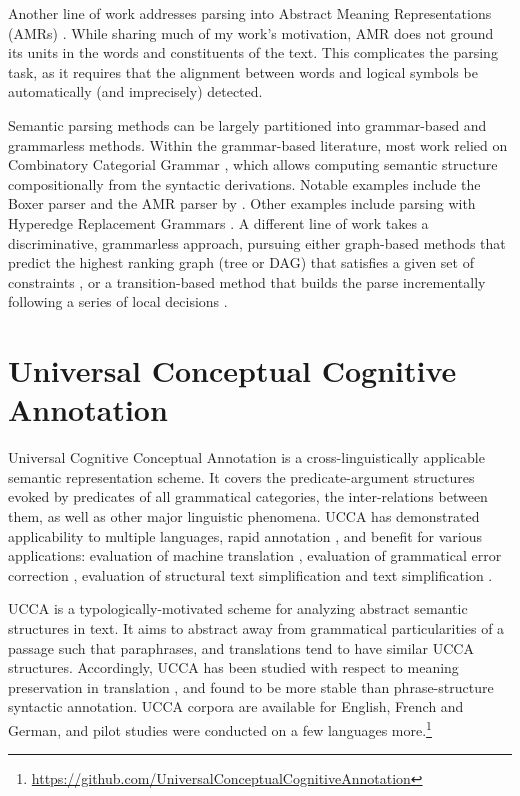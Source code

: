 \documentclass[12pt,a4paper,table]{report}
\begin{document}
Another line of work addresses parsing into Abstract Meaning Representations (AMRs)
\citep{banarescu2013abstract,flanigan2014discriminative,vanderwende2015amr,pust2015parsing,artzi2015broad}. 
While sharing much of my work's motivation,
AMR does not ground its units in the words and constituents of the text.
This complicates the parsing task, as it requires
that the alignment between words and logical symbols be automatically
(and imprecisely) detected.

Semantic parsing methods can be largely partitioned into grammar-based and grammarless methods.
Within the grammar-based literature, most work relied on Combinatory Categorial Grammar
\citep[CCG]{Steedman:00}, which allows computing semantic structure compositionally from the
syntactic derivations. Notable examples include the Boxer parser \citep{bos2005towards}
and the AMR parser by \citep{artzi2015broad}.
Other examples include parsing with Hyperedge Replacement Grammars
\citep{jones2012semantics}.
A different line of work takes a discriminative, grammarless approach,
pursuing either graph-based methods that predict the highest ranking graph
(tree or DAG) that satisfies a given set of constraints
\citep[for AMR parsing]{flanigan2014discriminative},
or a transition-based method
that builds the parse incrementally following a series of local
decisions \citep{Nivre03anefficient}.

\section{Universal Conceptual Cognitive Annotation}

Universal Cognitive Conceptual Annotation \citep[UCCA;][]{abend2013universal}
is a cross-linguistically applicable semantic representation scheme.
It covers the predicate-argument
structures evoked by predicates of all grammatical categories, the inter-relations between them,
as well as other major linguistic phenomena.
UCCA has demonstrated applicability to multiple languages,
rapid annotation \citep{abend2017uccaapp},
and benefit for various applications:
evaluation of machine translation \citep{birch2016hume},
evaluation of grammatical error correction \citep{choshen2018reference},
evaluation of structural text simplification \citep{sulem2018semantic}
and text simplification \citep{sulem2018simple}.

UCCA is a typologically-motivated scheme for analyzing abstract semantic structures in text. It aims to abstract away from grammatical particularities of a passage 
such that paraphrases, and translations tend to have similar UCCA structures.
Accordingly, UCCA has been studied with respect to meaning preservation in translation \citep{sulem2015conceptual},
and found to be more stable than phrase-structure syntactic annotation.
UCCA corpora are available for English, French and German, and pilot studies were conducted on a few languages more.\footnote{\scriptsize\url{https://github.com/UniversalConceptualCognitiveAnnotation}}
\end{document}
